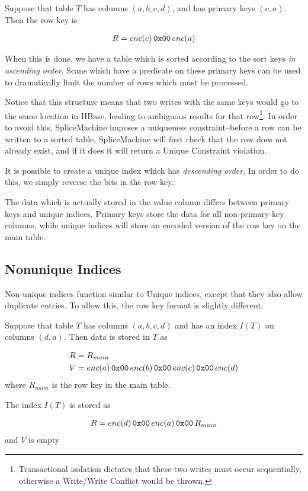 \begin{exmp}
Suppose that table $T$ has columns $(a,b,c,d)$, and has primary keys $(c,a)$. Then the row key is

\begin{align*}
R &= enc(c)\,\texttt{0x00}\,enc(a)\\
\end{align*}
\end{exmp}

When this is done, we have a table which is sorted according to the sort keys \emph{in ascending order}. Scans which have a predicate on these primary keys can be used to dramatically limit the number of rows which must be processed.

Notice that this structure means that two writes with the same keys would go to the same location in HBase, leading to ambiguous results for that row\footnote{Transactional isolation dictates that these two writes must occur sequentially, otherwise a Write/Write Conflict would be thrown.}. In order to avoid this, SpliceMachine imposes a uniqueness constraint--before a row can be written to a sorted table, SpliceMachine will first check that the row does not already exist, and if it does it will return a Unique Constraint violation.

It is possible to create a unique index which has \emph{descending order}. In order to do this, we simply reverse the bits in the row key.

The data which is actually stored in the value column differs between primary keys and unique indices. Primary keys store the data for all non-primary-key columns, while unique indices will store an encoded version of the row key on the main table.

\subsection{Nonunique Indices}
Non-unique indices function similar to Unique indices, except that they also allow duplicate entries. To allow this, the row key format is slightly different:

\begin{exmp}
Suppose that table $T$ has columns $(a,b,c,d)$ and has an index $I(T)$ on columns $(d,a)$. Then data is stored in $T$ as

\begin{align*}
				R	&=R_{main} \\
V	&= enc(a)\,\texttt{0x00}\,enc(b)\,\texttt{0x00}\,enc(c)\,\texttt{0x00}\,enc(d)
\end{align*}
where $R_{main}$ is the row key in the main table.

The index $I(T)$ is stored as

\begin{align*}
				R &= enc(d) \,\texttt{0x00}\, enc(a) \,\texttt{0x00}\, R_{main}\\
\end{align*}
and $V$ is empty
\end{exmp}

